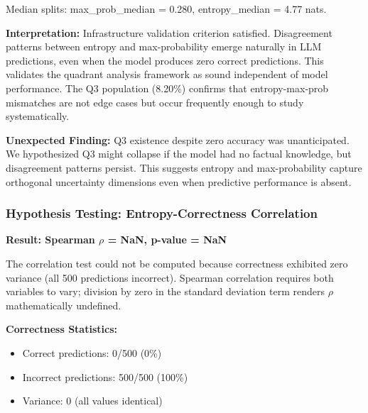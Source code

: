 \begin{table}[htbp]
\centering
{}
\end{table}

Median splits: max\_prob\_median = 0.280, entropy\_median = 4.77 nats.

\textbf{Interpretation:} Infrastructure validation criterion satisfied. Disagreement patterns between entropy and max-probability emerge naturally in LLM predictions, even when the model produces zero correct predictions. This validates the quadrant analysis framework as sound independent of model performance. The Q3 population (8.20\%) confirms that entropy-max-prob mismatches are not edge cases but occur frequently enough to study systematically.

\textbf{Unexpected Finding:} Q3 existence despite zero accuracy was unanticipated. We hypothesized Q3 might collapse if the model had no factual knowledge, but disagreement patterns persist. This suggests entropy and max-probability capture orthogonal uncertainty dimensions even when predictive performance is absent.

\subsubsection{Hypothesis Testing: Entropy-Correctness Correlation}

\textbf{Result: Spearman $\rho$ = NaN, p-value = NaN}

The correlation test could not be computed because correctness exhibited zero variance (all 500 predictions incorrect). Spearman correlation requires both variables to vary; division by zero in the standard deviation term renders $\rho$ mathematically undefined.

\textbf{Correctness Statistics:}
\begin{itemize}
\item Correct predictions: 0/500 (0\%)
\item Incorrect predictions: 500/500 (100\%)
\item Variance: 0 (all values identical)
\end{itemize}

